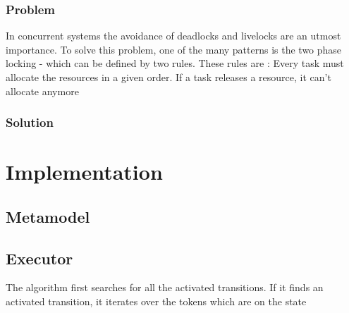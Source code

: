 			\subsubsection{Problem}
				In concurrent systems the avoidance of deadlocks and livelocks are an utmost importance.
				To solve this problem, one of the many patterns is  the two phase locking - which can be defined by two rules.
				These rules are : 
					Every task must allocate the resources in a given order.
					If a task releases a resource, it can't allocate anymore
			\subsubsection{Solution}

	\section{Implementation}
		\subsection{Metamodel}
		\subsection{Executor}
			The algorithm first searches for all the activated transitions.
			If it finds an activated transition, it iterates over the tokens which are on the state 
